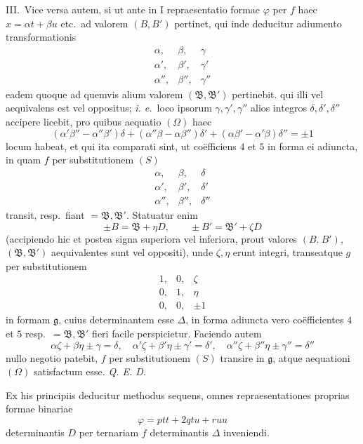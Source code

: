 III.\ Vice versa autem, si ut ante in I repraesentatio formae $\varphi$ per $f$
haec $x=\alpha t+\beta u$ etc.\ ad valorem $(B,B')$ pertinet, qui inde deducitur
adiumento transformationis
\[
\begin{array}{ccc}
\alpha,&\beta,&\gamma\\
\alpha',&\beta',&\gamma'\\
\alpha'',&\beta'',&\gamma''
\end{array}
\]
eadem quoque ad quemvis alium valorem $(\mathfrak{B},\mathfrak{B}')$ pertinebit.
qui illi vel aequivalens est vel oppositus; \textit{i. e.}\ loco ipsorum
$\gamma,\gamma',\gamma''$ alios integros $\delta,\delta',\delta''$ accipere
licebit, pro quibus aequatio $(\Omega)$ haec
\[
(\alpha'\beta''-\alpha''\beta')\delta+
(\alpha''\beta-\alpha\beta'')\delta'+
(\alpha\beta'-\alpha'\beta)\delta''=\pm1
\]
locum habeat, et qui ita comparati sint, ut coëfficiens $4$ et $5$ in forma ei
adiuncta, in quam $f$ per substitutionem $(S)$
\[
\begin{array}{ccc}
\alpha,&\beta,&\delta\\
\alpha',&\beta',&\delta'\\
\alpha'',&\beta'',&\delta''
\end{array}
\]
transit, resp.\ fiant $=\mathfrak{B},\mathfrak{B}'$. Statuatur enim
\[
\pm B=\mathfrak{B}+\eta D,\qquad \pm B'=\mathfrak{B}'+\zeta D
\]
(accipiendo hic et postea signa superiora vel inferiora, prout valores
$(B.\ B')$, $(\mathfrak{B},\mathfrak{B}')$ aequivalentes sunt vel oppositi),
unde $\zeta,\eta$ erunt integri, transeatque $g$ per substitutionem
\[
\begin{array}{ccc}
1,&0,&\zeta\\
0,&1,&\eta\\
0,&0,&\pm1
\end{array}
\]
in formam $\mathfrak{g}$, cuius determinantem esse $\Delta$, in forma adiuncta
vero coëfficientes $4$ et $5$ resp.\ $=\mathfrak{B},\mathfrak{B}'$ fieri facile
perspicietur. Faciendo autem
\[
\alpha\zeta+\beta\eta\pm\gamma=\delta,\quad
\alpha'\zeta+\beta'\eta\pm\gamma'=\delta',\quad
\alpha''\zeta+\beta''\eta\pm\gamma''=\delta''
\]
nullo negotio patebit, $f$ per substitutionem $(S)$ transire in $\mathfrak{g}$,
atque aequationi $(\Omega)$ satisfactum esse. \textit{Q. E. D.}

Ex his principiis deducitur methodus sequens, omnes repraesentationes proprias
formae binariae
\[
\varphi=ptt+2qtu+ruu
\]
determinantis $D$ per ternariam $f$ determinantis $\Delta$ inveniendi.

